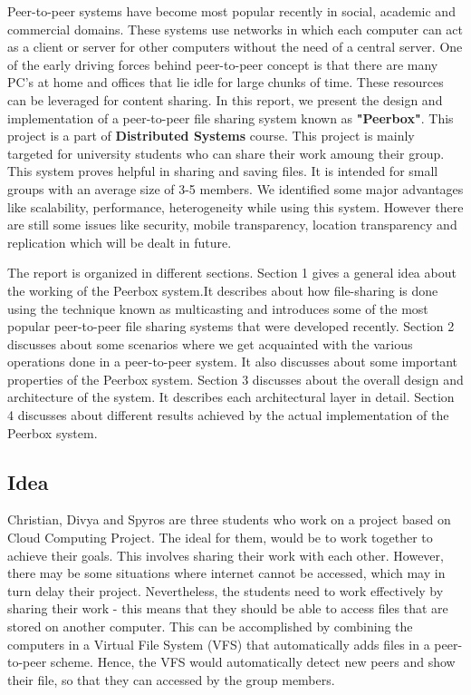 Peer-to-peer systems have become most popular recently in social, academic and commercial domains. These systems use networks in which each computer can act as a client or server for other computers without the need of a central server. One of the early driving forces behind peer-to-peer concept is that there are many PC's at home and offices that lie idle for large chunks of time. These resources can be leveraged for content sharing. In this report, we present the design and implementation of a peer-to-peer file sharing system known as \textbf{"Peerbox"}. This project is a part of  \textbf{Distributed Systems} course. This project is mainly targeted for university students who can share their work amoung their group. This system proves helpful in sharing and saving files. It is intended for small groups with an average size of 3-5 members. We identified some major advantages like scalability, performance, heterogeneity while using this system. However there are still some issues like security, mobile transparency, location transparency and replication which will be dealt in future.  


The report is organized in different sections. Section 1 gives a general idea about the working of the Peerbox system.It describes about how file-sharing is done using the technique known as multicasting and introduces some of the most popular peer-to-peer file sharing systems that were developed recently. Section 2 discusses about some scenarios where we get acquainted with the various operations done in a peer-to-peer system.  It also discusses about some important properties of the Peerbox system. Section 3 discusses about the overall design and architecture of the system. It describes each architectural layer in detail. Section 4 discusses about different results achieved by the actual implementation of the Peerbox system.       
\subsection{Idea}

Christian, Divya and Spyros are three students who work on a project based on Cloud Computing Project. The ideal for them, would be to work together to achieve their goals. This involves sharing their work with each other. However, there may be some situations where internet cannot be accessed, which may in turn delay their project. Nevertheless, the students need to work effectively by sharing their work - this means that they should be able to access files that are stored on another computer. This can be accomplished by combining the computers in a Virtual File System (VFS) that automatically adds files in a peer-to-peer scheme. Hence, the VFS would automatically detect new peers and show their file, so that they can accessed by the group members.

